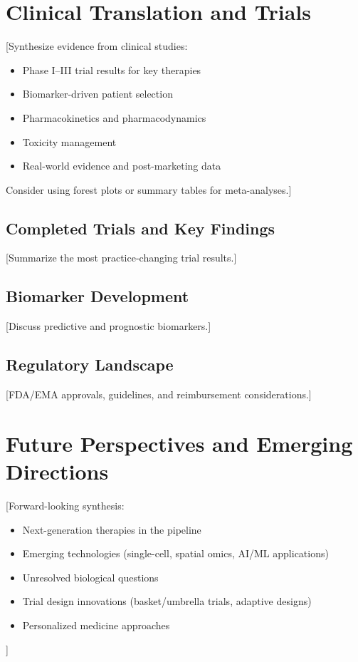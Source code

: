 \documentclass[11pt,a4paper]{article}
\begin{document}
\section{Clinical Translation and Trials}
[Synthesize evidence from clinical studies:
\begin{itemize}
    \item Phase I–III trial results for key therapies
    \item Biomarker-driven patient selection
    \item Pharmacokinetics and pharmacodynamics
    \item Toxicity management
    \item Real-world evidence and post-marketing data
\end{itemize}

Consider using forest plots or summary tables for meta-analyses.]

\subsection{Completed Trials and Key Findings}
[Summarize the most practice-changing trial results.]

\subsection{Biomarker Development}
[Discuss predictive and prognostic biomarkers.]

\subsection{Regulatory Landscape}
[FDA/EMA approvals, guidelines, and reimbursement considerations.]

\section{Future Perspectives and Emerging Directions}
[Forward-looking synthesis:
\begin{itemize}
    \item Next-generation therapies in the pipeline
    \item Emerging technologies (single-cell, spatial omics, AI/ML applications)
    \item Unresolved biological questions
    \item Trial design innovations (basket/umbrella trials, adaptive designs)
    \item Personalized medicine approaches
\end{itemize}]
\end{document}
